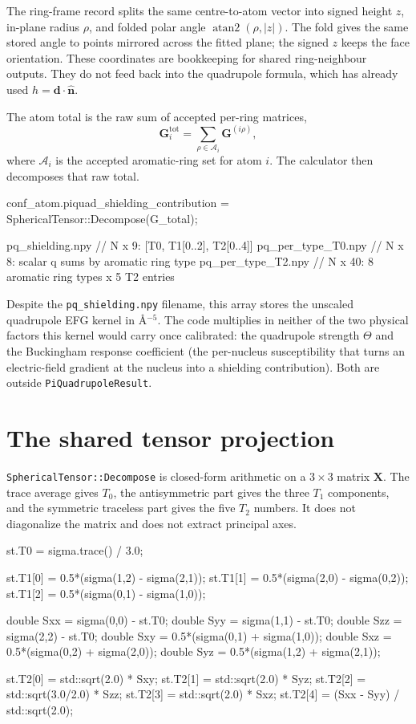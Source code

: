 \documentclass[11pt]{article}
\newcommand{\code}[1]{\texttt{#1}}
\begin{document}
The ring-frame record splits the same centre-to-atom vector into signed height
\(z\), in-plane radius \(\rho\), and folded polar angle
\(\operatorname{atan2}(\rho,|z|)\). The fold gives the same stored angle to
points mirrored across the fitted plane; the signed \(z\) keeps the face
orientation. These coordinates are bookkeeping for shared ring-neighbour
outputs. They do not feed back into the quadrupole formula, which has already
used \(h=\bm d\cdot\hat{\bm n}\).

The atom total is the raw sum of accepted per-ring matrices,
\[
  \bm G_i^{\mathrm{tot}} =
  \sum_{\rho\in\mathcal A_i}\bm G^{(i\rho)} ,
\]
where \(\mathcal A_i\) is the accepted aromatic-ring set for atom \(i\). The
calculator then decomposes that raw total.

\begin{codebox}
conf_atom.piquad_shielding_contribution =
    SphericalTensor::Decompose(G_total);

pq_shielding.npy     // N x 9:  [T0, T1[0..2], T2[0..4]]
pq_per_type_T0.npy   // N x 8:  scalar q sums by aromatic ring type
pq_per_type_T2.npy   // N x 40: 8 aromatic ring types x 5 T2 entries
\end{codebox}

Despite the \code{pq\_shielding.npy} filename, this array stores the unscaled
quadrupole EFG kernel in \(\si{\angstrom^{-5}}\). The code multiplies in neither
of the two physical factors this kernel would carry once calibrated: the
quadrupole strength \(\Theta\) and the Buckingham response coefficient (the
per-nucleus susceptibility that turns an electric-field gradient at the nucleus
into a shielding contribution). Both are outside \code{PiQuadrupoleResult}.

\section{The shared tensor projection}

\code{SphericalTensor::Decompose} is closed-form arithmetic on a \(3\times3\)
matrix \(\bm X\). The trace average gives \(T_0\), the antisymmetric part gives
the three \(T_1\) components, and the symmetric traceless part gives the five
\(T_2\) numbers. It does not diagonalize the matrix and does not extract
principal axes.

\begin{codebox}
st.T0 = sigma.trace() / 3.0;

st.T1[0] = 0.5*(sigma(1,2) - sigma(2,1));
st.T1[1] = 0.5*(sigma(2,0) - sigma(0,2));
st.T1[2] = 0.5*(sigma(0,1) - sigma(1,0));

double Sxx = sigma(0,0) - st.T0;
double Syy = sigma(1,1) - st.T0;
double Szz = sigma(2,2) - st.T0;
double Sxy = 0.5*(sigma(0,1) + sigma(1,0));
double Sxz = 0.5*(sigma(0,2) + sigma(2,0));
double Syz = 0.5*(sigma(1,2) + sigma(2,1));

st.T2[0] = std::sqrt(2.0) * Sxy;
st.T2[1] = std::sqrt(2.0) * Syz;
st.T2[2] = std::sqrt(3.0/2.0) * Szz;
st.T2[3] = std::sqrt(2.0) * Sxz;
st.T2[4] = (Sxx - Syy) / std::sqrt(2.0);
\end{codebox}
\end{document}

